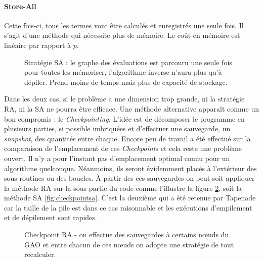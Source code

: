 \paragraph{Store-All}
Cette fois-ci, tous les termes vont être calcul\'es et enregistr\'es une seule fois. Il s'agit d'une
m\'ethode qui n\'ecessite plus de m\'emoire. Le co\^ut en m\'emoire est lin\'eaire par rapport \`a $p$.


\begin{figure}
\caption{Strat\'egie SA : le graphe des \'evaluations est parcouru une seule fois pour toutes les m\'emoriser, l'algorithme inverse n'aura plus qu'\`a d\'epiler. Prend
moins de temps mais plus de capacit\'e de stockage.}
\begin{center}




\end{center}
\label{fig:sa}
\end{figure}



Dans les deux cas, si le probl\`eme a une dimension trop grande, ni la strat\'egie RA, ni la SA ne pourra être
efficace. Une m\'ethode alternative appara\^it comme un bon compromis : le {\it Checkpointing}.
L'id\'ee est de d\'ecomposer le programme en plusieurs parties, si possible imbriqu\'ees et d'effectuer une sauvegarde, un {\it snapshot},
des quantit\'es entre chaque. Encore peu de travail a \'et\'e effectu\'e sur la comparaison de l'emplacement de ces {\it Checkpoints} et cela
reste une probl\`eme ouvert. Il n'y a pour l'instant pas d'emplacement optimal connu pour un algorithme quelconque. N\'eanmoins, 
ils seront \'evidemment plac\'es \`a l'ext\'erieur des sous-routines ou des boucles. \`A partir des ces 
sauvegardes on peut soit appliquer la m\'ethode RA sur la sous partie du code comme l'illustre la figure \ref{fig:checkpointra}, soit
la m\'ethode SA \ref{fig:checkpointsa}. C'est la deuxi\`eme qui a \'et\'e retenue par Tapenade car la taille de la pile est dans ce cas 
raisonnable et les ex\'ecutions d'empilement et de d\'epilement sont rapides.


\begin{figure}
\caption{Checkpoint RA - on effectue des sauvegardes \`a certains
n\oe uds du GAO et entre chacun de ces n\oe uds on adopte une strat\'egie de tout recalculer.}
\begin{center}
\end{center}
\label{fig:checkpointra}
\end{figure}

